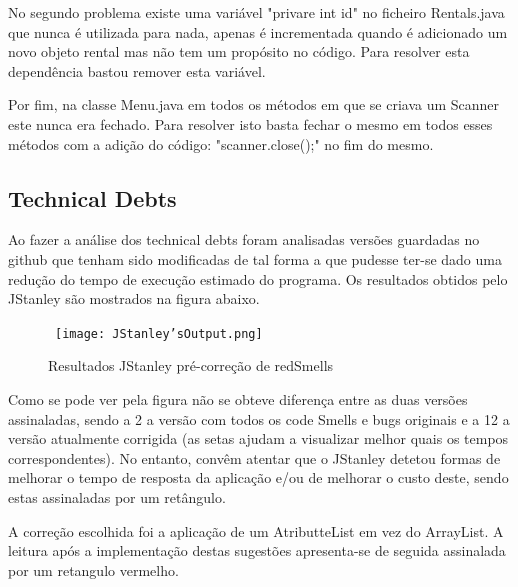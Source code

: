 \par No segundo problema existe uma variável "privare int id" no ficheiro Rentals.java que nunca é utilizada para nada, apenas é incrementada quando é adicionado um novo objeto rental mas não tem um propósito no código. Para resolver esta dependência bastou remover esta variável.\newline 

\par Por fim, na classe Menu.java em todos os métodos em que se criava um Scanner este nunca era fechado. Para resolver isto basta fechar o mesmo em todos esses métodos com a adição do código: "scanner.close();" no fim do mesmo.\newline


\subsection{Technical Debts}

Ao fazer a análise dos technical debts foram analisadas versões guardadas no github que tenham sido modificadas de tal forma a que pudesse ter-se dado uma redução do tempo de execução estimado do programa. Os resultados obtidos pelo JStanley são mostrados na figura abaixo.

\begin{figure}[H]

  \centering

  \hbox{\hspace{-8em} \texttt{[image: JStanley'sOutput.png]}}

  \caption {Resultados JStanley pré-correção de redSmells}

  \label {fig28}

\end{figure}

\par Como se pode ver pela figura  não se obteve diferença entre as duas versões assinaladas, sendo a 2 a versão com todos os code Smells e bugs originais e a 12 a versão atualmente corrigida (as setas ajudam a visualizar melhor quais os tempos correspondentes). No entanto, convêm atentar que o JStanley detetou formas de melhorar o tempo de resposta da aplicação e/ou de melhorar o custo deste, sendo estas assinaladas por um retângulo. \newline


\par A correção escolhida foi a aplicação de um AtributteList em vez do ArrayList. A leitura após a implementação destas sugestões apresenta-se de seguida assinalada por um retangulo vermelho.\newline

